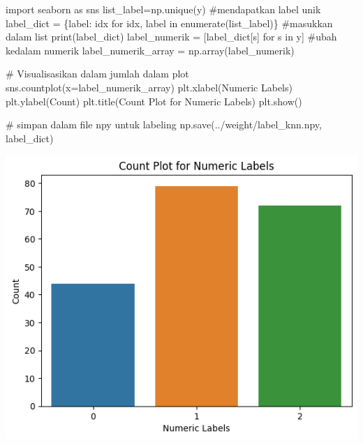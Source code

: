 \documentclass[
  letterpaper,
  DIV=11,
  numbers=noendperiod]{scrreprt}
\newenvironment{Shaded}{\begin{snugshade}}{\end{snugshade}}
\newcommand{\BuiltInTok}[1]{\textcolor[rgb]{0.00,0.23,0.31}{#1}}
\newcommand{\CommentTok}[1]{\textcolor[rgb]{0.37,0.37,0.37}{#1}}
\newcommand{\ControlFlowTok}[1]{\textcolor[rgb]{0.00,0.23,0.31}{#1}}
\newcommand{\ImportTok}[1]{\textcolor[rgb]{0.00,0.46,0.62}{#1}}
\newcommand{\KeywordTok}[1]{\textcolor[rgb]{0.00,0.23,0.31}{#1}}
\newcommand{\NormalTok}[1]{\textcolor[rgb]{0.00,0.23,0.31}{#1}}
\newcommand{\OperatorTok}[1]{\textcolor[rgb]{0.37,0.37,0.37}{#1}}
\newcommand{\StringTok}[1]{\textcolor[rgb]{0.13,0.47,0.30}{#1}}
\begin{document}
\begin{Shaded}
\begin{Highlighting}[]
\ImportTok{import}\NormalTok{ seaborn }\ImportTok{as}\NormalTok{ sns}
\NormalTok{list\_label}\OperatorTok{=}\NormalTok{np.unique(y) }\CommentTok{\#mendapatkan label unik}
\NormalTok{label\_dict }\OperatorTok{=}\NormalTok{ \{label: idx }\ControlFlowTok{for}\NormalTok{ idx, label }\KeywordTok{in} \BuiltInTok{enumerate}\NormalTok{(list\_label)\} }\CommentTok{\#masukkan dalam list}
\BuiltInTok{print}\NormalTok{(label\_dict)}
\NormalTok{label\_numerik }\OperatorTok{=}\NormalTok{ [label\_dict[s] }\ControlFlowTok{for}\NormalTok{ s }\KeywordTok{in}\NormalTok{ y] }\CommentTok{\#ubah kedalam numerik}
\NormalTok{label\_numerik\_array }\OperatorTok{=}\NormalTok{ np.array(label\_numerik)}

\CommentTok{\# Visualisasikan dalam jumlah dalam plot}
\NormalTok{sns.countplot(x}\OperatorTok{=}\NormalTok{label\_numerik\_array)}
\NormalTok{plt.xlabel(}\StringTok{\textquotesingle{}Numeric Labels\textquotesingle{}}\NormalTok{)}
\NormalTok{plt.ylabel(}\StringTok{\textquotesingle{}Count\textquotesingle{}}\NormalTok{)}
\NormalTok{plt.title(}\StringTok{\textquotesingle{}Count Plot for Numeric Labels\textquotesingle{}}\NormalTok{)}
\NormalTok{plt.show()  }

\CommentTok{\# simpan dalam file npy untuk labeling}
\NormalTok{np.save(}\StringTok{\textquotesingle{}../weight/label\_knn.npy\textquotesingle{}}\NormalTok{, label\_dict)}
\end{Highlighting}
\end{Shaded}

\includegraphics{Asset/plot_siftbovw.png}
\end{document}
